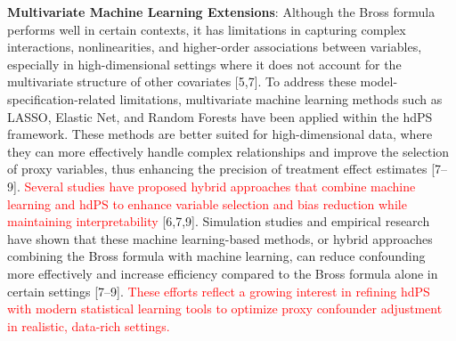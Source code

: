 \documentclass[10pt,letterpaper]{article}
\begin{document}
\textbf{Multivariate Machine Learning Extensions}: Although the Bross
formula performs well in certain contexts, it has limitations in
capturing complex interactions, nonlinearities, and higher-order
associations between variables, especially in high-dimensional settings
where it does not account for the multivariate structure of other
covariates {[}5,7{]}. To address these model-specification-related
limitations, multivariate machine learning methods such as LASSO,
Elastic Net, and Random Forests have been applied within the hdPS
framework. These methods are better suited for high-dimensional data,
where they can more effectively handle complex relationships and improve
the selection of proxy variables, thus enhancing the precision of
treatment effect estimates {[}7--9{]}.
\textcolor{red}{Several studies have proposed hybrid approaches that combine machine learning and hdPS to enhance variable selection and bias reduction while maintaining interpretability}
{[}6,7,9{]}. Simulation studies and empirical research have shown that
these machine learning-based methods, or hybrid approaches combining the
Bross formula with machine learning, can reduce confounding more
effectively and increase efficiency compared to the Bross formula alone
in certain settings {[}7--9{]}.
\textcolor{red}{These efforts reflect a growing interest in refining hdPS with modern statistical learning tools to optimize proxy confounder adjustment in realistic, data-rich settings.}
\end{document}
